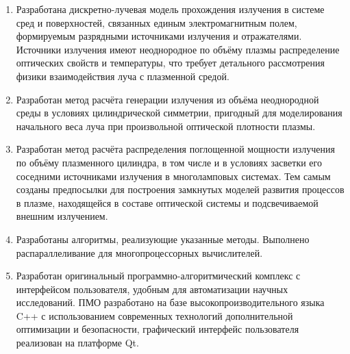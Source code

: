 \begin{enumerate}
	\item Разработана дискретно-лучевая модель прохождения излучения в системе сред и поверхностей, связанных единым электромагнитным полем, формируемым разрядными источниками излучения и отражателями.
	Источники излучения имеют неоднородное по объёму плазмы распределение оптических свойств и температуры, что требует детального рассмотрения  физики  взаимодействия луча с плазменной средой.

	\item Разработан метод расчёта генерации излучения из объёма неоднородной среды в условиях цилиндрической симметрии, пригодный для моделирования начального веса луча при произвольной оптической плотности плазмы.

	\item Разработан метод расчёта распределения поглощенной мощности излучения по объёму плазменного цилиндра, в том числе и в условиях засветки его соседними источниками излучения в многоламповых системах.
	Тем самым созданы предпосылки для построения замкнутых  моделей развития процессов в плазме, находящейся  в составе оптической системы и подсвечиваемой внешним излучением.

	\item Разработаны алгоритмы, реализующие указанные методы.
	Выполнено распараллеливание для многопроцессорных вычислителей.

	\item Разработан оригинальный программно-алгоритмический комплекс с интерфейсом пользователя, удобным для автоматизации научных исследований.
	ПМО разработано на базе высокопроизводительного языка C++ с использованием современных технологий дополнительной оптимизации и безопасности, графический интерфейс пользователя реализован на платформе Qt.


\end{enumerate}
